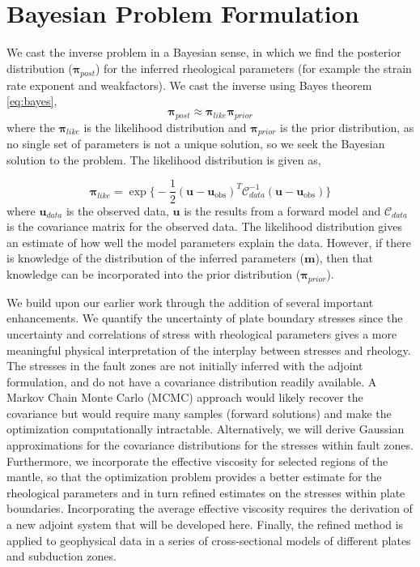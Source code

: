 \documentclass[12pt]{article}
\newcommand{\mm}{{\ensuremath{\boldsymbol{m}}}}
\newcommand{\uu}{{\ensuremath{\boldsymbol{u}}}}
\newcommand{\ppi}{{\ensuremath{\boldsymbol{\pi}}}}
\begin{document}
 
\section{Bayesian Problem Formulation}
We cast the inverse problem in a Bayesian sense, in which we find the posterior distribution ($\ppi_{post}$) for the inferred rheological parameters (for example the strain rate exponent and weakfactors). 
We cast the inverse using Bayes theorem \eqref{eq:bayes},
\begin{equation}
\ppi_{post} \approx \ppi_{like}\ppi_{prior}
\label{eq:bayes}
\end{equation}
where the $\ppi_{like}$ is the likelihood distribution and $\ppi_{prior}$ is the prior distribution, as 
no single set of parameters is not a unique solution, so we seek the Bayesian solution to the problem. The likelihood distribution is given as,

\begin{equation}
\ppi_{like} = \exp{\Big\{-\frac{1}{2} (\uu-\uu_{\text{obs}})^T\mathcal{C}^{-1}_{data}(\uu-\uu_{\text{obs}})}\Big\}
\label{eq:like}
\end{equation}
where $\uu_{data}$ is the observed data, $\uu$ is the results from a forward model and $\mathcal{C}_{data}$ is the covariance matrix for the observed data. The likelihood distribution gives an estimate of how well the model parameters explain the data. However, if there is knowledge of the distribution of the inferred parameters ($\mm$), then that knowledge can be incorporated into the prior distribution ($\ppi_{prior}$).

We build upon our earlier work \citep{ratnaswamy2015adjoint} through the addition of several important enhancements. We quantify the uncertainty of plate boundary stresses since the uncertainty and correlations of stress with rheological parameters gives a more meaningful physical interpretation of the interplay between stresses and rheology. The stresses in the fault zones are not initially inferred with the adjoint formulation, and do not have a covariance distribution readily available. A Markov Chain Monte Carlo (MCMC) approach would likely recover the covariance but would require many samples (forward solutions) and make the optimization computationally intractable. Alternatively, we will derive Gaussian approximations for the covariance distributions for the stresses within fault zones.
Furthermore, we incorporate the effective viscosity for selected regions of the mantle, 
so that the optimization problem provides a better estimate for the rheological parameters and in turn refined estimates on the stresses within plate boundaries. Incorporating the average effective viscosity requires the derivation of a new adjoint system that will be developed here. 
Finally, the refined method is applied to geophysical data in a series of cross-sectional models of different plates and subduction zones.
\end{document}
